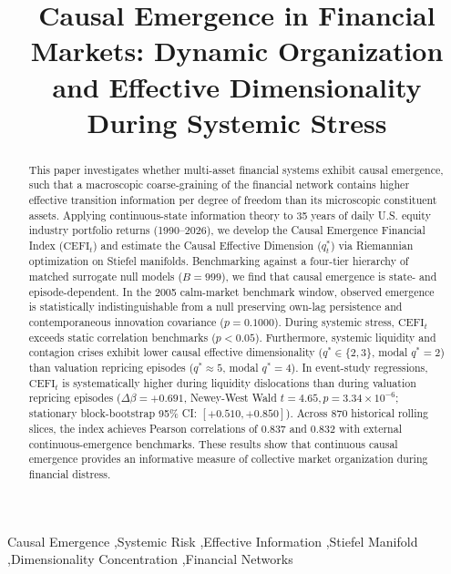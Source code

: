 \documentclass[review,12pt,authoryear]{elsarticle}
\begin{document}
\begin{frontmatter}

\title{Causal Emergence in Financial Markets: Dynamic Organization and Effective Dimensionality During Systemic Stress}

\author{}

\begin{abstract}
This paper investigates whether multi-asset financial systems exhibit causal emergence, such that a macroscopic coarse-graining of the financial network contains higher effective transition information per degree of freedom than its microscopic constituent assets. Applying continuous-state information theory to 35 years of daily U.S. equity industry portfolio returns (1990--2026), we develop the Causal Emergence Financial Index ($\mathrm{CEFI}_t$) and estimate the Causal Effective Dimension ($q_t^*$) via Riemannian optimization on Stiefel manifolds. Benchmarking against a four-tier hierarchy of matched surrogate null models ($B=999$), we find that causal emergence is state- and episode-dependent. In the 2005 calm-market benchmark window, observed emergence is statistically indistinguishable from a null preserving own-lag persistence and contemporaneous innovation covariance ($p = 0.1000$). During systemic stress, $\mathrm{CEFI}_t$ exceeds static correlation benchmarks ($p < 0.05$). Furthermore, systemic liquidity and contagion crises exhibit lower causal effective dimensionality ($q^* \in \{2, 3\}$, modal $q^* = 2$) than valuation repricing episodes ($q^* \approx 5$, modal $q^* = 4$). In event-study regressions, $\mathrm{CEFI}_t$ is systematically higher during liquidity dislocations than during valuation repricing episodes ($\Delta \beta = +0.691$, Newey-West Wald $t = 4.65, p = 3.34 \times 10^{-6}$; stationary block-bootstrap 95\% CI: $[+0.510, +0.850]$). Across 870 historical rolling slices, the index achieves Pearson correlations of 0.837 and 0.832 with external continuous-emergence benchmarks. These results show that continuous causal emergence provides an informative measure of collective market organization during financial distress.
\end{abstract}


\begin{keyword}
Causal Emergence \sep Systemic Risk \sep Effective Information \sep Stiefel Manifold \sep Dimensionality Concentration \sep Financial Networks
\end{keyword}

\end{frontmatter}
\end{document}
